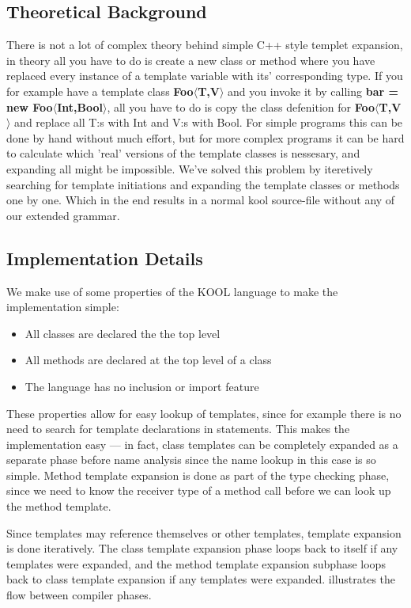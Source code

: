 \subsection{Theoretical Background}
There is not a lot of complex theory behind simple C++ style templet expansion,
in theory all you have to do is create a new class or method where you have
replaced every instance of a template variable with its' corresponding type.
If you for example have a template class \textbf{Foo$\langle$T,V$\rangle$} and you
invoke it by calling \textbf{bar = new Foo$\langle$Int,Bool$\rangle$}, all you have to
do is copy the class defenition for \textbf{Foo$\langle$T,V$\rangle$} and replace all
T:s with Int and V:s with Bool. For simple programs this can be done by hand
without much effort, but for more complex programs it can be hard to calculate
which 'real' versions of the template classes is nessesary, and expanding all
might be impossible. We've solved this problem by iteretively searching for
template initiations and expanding the template classes or methods one by one.
Which in the end results in a normal kool source-file without any of our
extended grammar.

\subsection{Implementation Details}

We make use of some properties of the KOOL language to make the implementation simple:

\begin{itemize}
    \item All classes are declared the the top level
    \item All methods are declared at the top level of a class
    \item The language has no inclusion or import feature
\end{itemize}

These properties allow for easy lookup of templates, since for example there is no need to search
for template declarations in statements. This makes the implementation easy --- in fact, class
templates can be completely expanded as a separate phase before name analysis since the name lookup
in this case is so simple. Method template expansion is done as part of the type checking phase,
since we need to know the receiver type of a method call before we can look up the method template.

Since templates may reference themselves or other templates, template expansion is done iteratively.
The class template expansion phase loops back to itself if any templates were expanded, and the
method template expansion subphase loops back to class template expansion if any templates were
expanded.  illustrates the flow between compiler phases.

